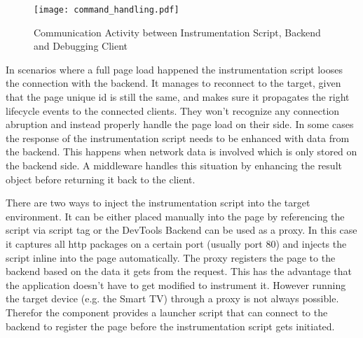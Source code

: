 \begin{figure}[htb]
  \centering
  \texttt{[image: command\_handling.pdf]}\\
  \caption{Communication Activity between Instrumentation Script, Backend and Debugging Client}\label{fig:command_handling}
\end{figure}

In scenarios where a full page load happened the instrumentation script looses the connection with the backend. It manages to reconnect to the target, given that the page unique id is still the same, and makes sure it propagates the right lifecycle events to the connected clients. They won't recognize any connection abruption and instead properly handle the page load on their side. In some cases the response of the instrumentation script needs to be enhanced with data from the backend. This happens when network data is involved which is only stored on the backend side. A middleware handles this situation by enhancing the result object before returning it back to the client.

There are two ways to inject the instrumentation script into the target environment. It can be either placed manually into the page by referencing the script via script tag or the DevTools Backend can be used as a proxy. In this case it captures all http packages on a certain port (usually port 80) and injects the script inline into the page automatically. The proxy registers the page to the backend based on the data it gets from the request. This has the advantage that the application doesn't have to get modified to instrument it. However running the target device (e.g. the Smart TV) through a proxy is not always possible. Therefor the component provides a launcher script that can connect to the backend to register the page before the instrumentation script gets initiated.

